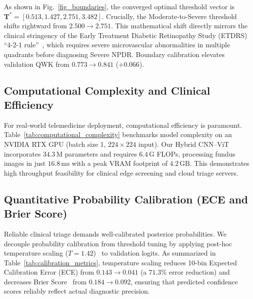 \documentclass[conference]{IEEEtran}
\begin{document}
As shown in Fig.~\ref{fig_boundaries}, the converged optimal threshold vector is $\mathbf{T}^* = [0.513, 1.427, 2.751, 3.482]$. Crucially, the Moderate-to-Severe threshold shifts rightward from $2.500 \rightarrow 2.751$. This mathematical shift directly mirrors the clinical stringency of the Early Treatment Diabetic Retinopathy Study (ETDRS) ``4-2-1 rule''~\cite{etdrs1991grading}, which requires severe microvascular abnormalities in multiple quadrants before diagnosing Severe NPDR. Boundary calibration elevates validation QWK from $0.773 \rightarrow 0.841$ ($+0.066$).

\subsection{Computational Complexity and Clinical Efficiency}
For real-world telemedicine deployment, computational efficiency is paramount. Table~\ref{tab:computational_complexity} benchmarks model complexity on an NVIDIA RTX GPU (batch size 1, $224 \times 224$ input). Our Hybrid CNN--ViT incorporates $34.3\,\text{M}$ parameters and requires $6.4\,\text{G}$ FLOPs, processing fundus images in just $16.8\,\text{ms}$ with a peak VRAM footprint of $4.2\,\text{GB}$. This demonstrates high throughput feasibility for clinical edge screening and cloud triage servers.

\begin{table}[htbp]
\centering
\caption{Computational Complexity, FLOPs, Latency, and Peak Memory Footprint}
\label{tab:computational_complexity}
\end{table}

\subsection{Quantitative Probability Calibration (ECE and Brier Score)}
Reliable clinical triage demands well-calibrated posterior probabilities. We decouple probability calibration from threshold tuning by applying post-hoc temperature scaling ($T=1.42$)~\cite{guo2017calibration} to validation logits. As summarized in Table~\ref{tab:calibration_metrics}, temperature scaling reduces 10-bin Expected Calibration Error (ECE) from $0.143 \rightarrow 0.041$ (a $\mathbf{71.3\%}$ error reduction) and decreases Brier Score~\cite{platt1999probabilistic} from $0.184 \rightarrow 0.092$, ensuring that predicted confidence scores reliably reflect actual diagnostic precision.
\end{document}
